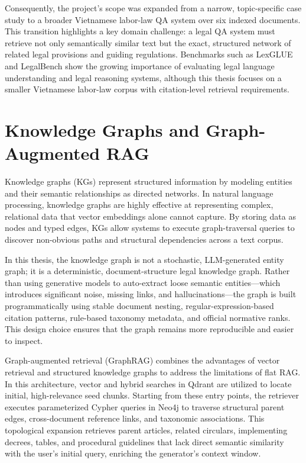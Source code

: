 Consequently, the project's scope was expanded from a narrow, topic-specific case study to a broader Vietnamese labor-law QA system over six indexed documents. This transition highlights a key domain challenge: a legal QA system must retrieve not only semantically similar text but the exact, structured network of related legal provisions and guiding regulations. Benchmarks such as LexGLUE \cite{chalkidis2021lexglue} and LegalBench \cite{guha2023legalbench} show the growing importance of evaluating legal language understanding and legal reasoning systems, although this thesis focuses on a smaller Vietnamese labor-law corpus with citation-level retrieval requirements.

\section{Knowledge Graphs and Graph-Augmented RAG}
Knowledge graphs (KGs) represent structured information by modeling entities and their semantic relationships as directed networks. In natural language processing, knowledge graphs are highly effective at representing complex, relational data that vector embeddings alone cannot capture. By storing data as nodes and typed edges, KGs allow systems to execute graph-traversal queries to discover non-obvious paths and structural dependencies across a text corpus.

In this thesis, the knowledge graph is not a stochastic, LLM-generated entity graph; it is a deterministic, document-structure legal knowledge graph. Rather than using generative models to auto-extract loose semantic entities—which introduces significant noise, missing links, and hallucinations—the graph is built programmatically using stable document nesting, regular-expression-based citation patterns, rule-based taxonomy metadata, and official normative ranks. This design choice ensures that the graph remains more reproducible and easier to inspect.

Graph-augmented retrieval (GraphRAG) combines the advantages of vector retrieval and structured knowledge graphs to address the limitations of flat RAG. In this architecture, vector and hybrid searches in Qdrant are utilized to locate initial, high-relevance seed chunks. Starting from these entry points, the retriever executes parameterized Cypher queries in Neo4j to traverse structural parent edges, cross-document reference links, and taxonomic associations. This topological expansion retrieves parent articles, related circulars, implementing decrees, tables, and procedural guidelines that lack direct semantic similarity with the user's initial query, enriching the generator's context window.

